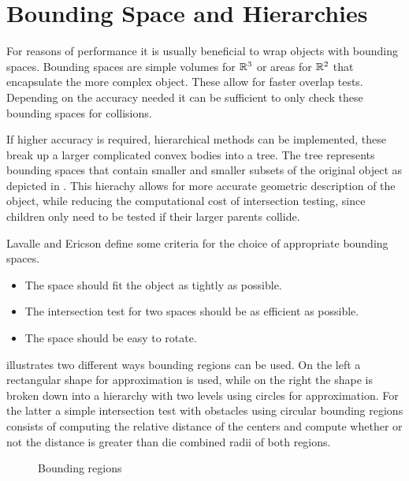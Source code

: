 \section{Bounding Space and Hierarchies}
For reasons of performance it is usually beneficial to wrap objects with bounding spaces. Bounding spaces are simple volumes for $\mathbb{R}^3$ or areas for $\mathbb{R}^2$ that encapsulate the more complex object. These allow for faster overlap tests. Depending on the accuracy needed it can be sufficient to only check these bounding spaces for collisions. \cite{LaValle.2006,Ericson.2005}

If higher accuracy is required, hierarchical methods can be implemented, these break up a larger complicated convex bodies into a tree. The tree represents bounding spaces that contain smaller and smaller subsets of the original object as depicted in . This hierachy allows for more accurate geometric description of the object, while reducing the computational cost of intersection testing, since children only need to be tested if their larger parents collide. \cite{LaValle.2006,Ericson.2005}

Lavalle and Ericson define some criteria for the choice of appropriate bounding spaces.

\begin{itemize}
	\item The space should fit the object as tightly as possible.
	\item The intersection test for two spaces should be as efficient as possible.
	\item The space should be easy to rotate.
\end{itemize}

 illustrates two different ways bounding regions can be used. On the left a rectangular shape for approximation is used, while on the right the shape is broken down into a hierarchy with two levels using circles for approximation. For the latter a simple intersection test with obstacles using circular bounding regions consists of computing the relative distance of the centers and compute whether or not the distance is greater than die combined radii of both regions.

\begin{figure}[h]
    \caption{Bounding regions}
    \label{fig:boundingRegions}
\end{figure}

